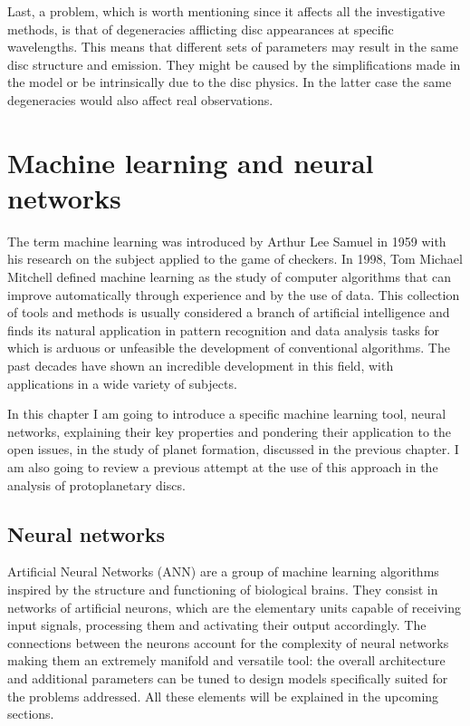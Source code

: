 \documentclass[a4paper,10pt]{report}
\begin{document}
Last, a problem, which is worth mentioning since it affects all the investigative methods,
is that of degeneracies afflicting disc appearances at specific
wavelengths. This means that different sets of parameters may result in the same disc structure and emission.
They might be caused by the simplifications made in the model or be intrinsically due to the disc physics. 
In the latter case the same degeneracies would also affect real observations.

\chapter{Machine learning and neural networks}

The term machine learning was introduced by Arthur Lee Samuel in 1959
with his research on the subject applied to the game of checkers.
In 1998, Tom Michael Mitchell defined machine learning as the study of
computer algorithms that can improve automatically through experience and by the use of data.
This collection of tools and methods is usually considered a branch of artificial intelligence and 
finds its natural application in pattern recognition and data analysis tasks for which is arduous or
unfeasible the development of conventional algorithms.
The past decades have shown an incredible development in this field,
with applications in a wide variety of subjects.

In this chapter I am going to introduce a specific machine learning tool, neural networks, explaining
their key properties and pondering their application to the open issues, in the study of planet formation,
discussed in the previous chapter. I am also going to review a previous attempt at the use of this approach in the 
analysis of protoplanetary discs.

\section{Neural networks}

Artificial Neural Networks (ANN) are a group of machine learning algorithms inspired by the structure and functioning 
of biological brains.
They consist in networks of artificial neurons,
which are the elementary units capable of receiving input signals, processing
them and activating their output accordingly. The connections between the neurons account for 
the complexity of neural networks making them an extremely manifold and versatile tool:
the overall architecture and additional parameters can be tuned to design 
models specifically suited for the problems addressed.
All these elements will be explained in the upcoming sections.
\end{document}
